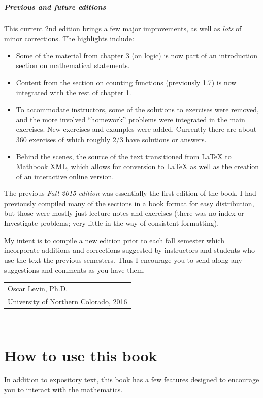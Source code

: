 \documentclass[10pt,]{book}
\theoremstyle{plain}
\theoremstyle{definition}
\theoremstyle{definition}
\theoremstyle{definition}
\theoremstyle{definition}
\numberwithin{equation}{chapter}
\begin{document}
\paragraph[{Previous and future editions}]{Previous and future editions}\hypertarget{pref_editions}{}
\hypertarget{p-6}{}%
This current 2nd edition brings a few major improvements, as well as \emph{lots} of minor corrections.  The highlights include: \leavevmode%
\begin{itemize}[label=\textbullet]
\item{}Some of the material from chapter 3 (on logic) is now part of an introduction section on mathematical statements.%
\item{}Content from the section on counting functions (previously 1.7) is now integrated with the rest of chapter 1.%
\item{}To accommodate instructors, some of the solutions to exercises were removed, and the more involved ``homework'' problems were integrated in the main exercises. New exercises and examples were added.  Currently there are about 360 exercises of which roughly 2/3 have solutions or answers.%
\item{}Behind the scenes, the source of the text transitioned from \LaTeX{} to Mathbook XML, which allows for conversion to \LaTeX{} as well as the creation of an interactive online version.%
\end{itemize}
%
\par
\hypertarget{p-7}{}%
The previous \emph{Fall 2015 edition} was essentially the first edition of the book. I had previously compiled many of the sections in a book format for easy distribution, but those were mostly just lecture notes and exercises (there was no index or Investigate problems; very little in the way of consistent formatting).%
\par
\hypertarget{p-8}{}%
My intent is to compile a new edition prior to each fall semester which incorporate additions and corrections suggested by instructors and students who use the text the previous semesters. Thus I encourage you to send along any suggestions and comments as you have them.%
\par\hfill\begin{tabular}{l@{}}
Oscar Levin, Ph.D.\\
University of Northern Colorado, 2016
\end{tabular}\\\par
\chapter*{How to use this book}\label{preface-2}
\hypertarget{p-9}{}%
In addition to expository text, this book has a few features designed to encourage you to interact with the mathematics.%
\typeout{************************************************}
\typeout{************************************************}
\end{document}
